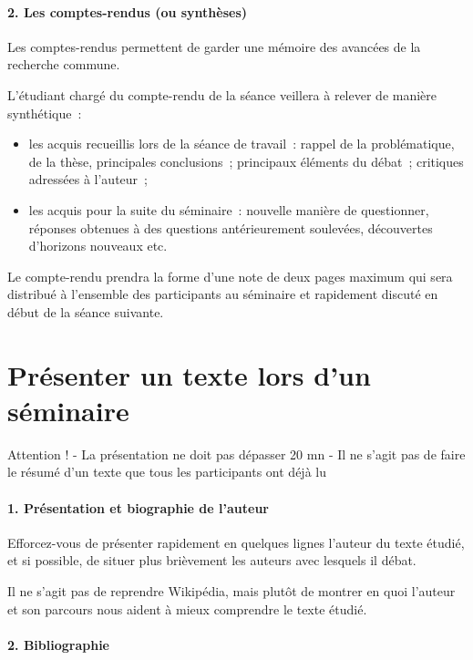 \paragraph{2. Les comptes-rendus (ou synthèses)}

Les comptes-rendus permettent de garder une mémoire des avancées de la
recherche commune.

L'étudiant chargé du compte-rendu de la séance veillera à relever de
manière synthétique~:

\begin{itemize}
\item
  les acquis recueillis lors de la séance de travail~: rappel de la
  problématique, de la thèse, principales conclusions~; principaux
  éléments du débat~; critiques adressées à l'auteur~;
\item
  les acquis pour la suite du séminaire~: nouvelle manière de
  questionner, réponses obtenues à des questions antérieurement
  soulevées, découvertes d'horizons nouveaux etc.
\end{itemize}

Le compte-rendu prendra la forme d'une note de deux pages maximum qui
sera distribué à l'ensemble des participants au séminaire et rapidement
discuté en début de la séance suivante.


\section{Présenter un texte lors d’un séminaire}


\begin{Prop}
Attention !
-	La présentation ne doit pas dépasser 20 mn
-	Il ne s’agit pas de faire le résumé d’un texte que tous les participants ont déjà lu
\end{Prop}


\paragraph{1.	Présentation et biographie de l’auteur 
}
Efforcez-vous de présenter rapidement en quelques lignes l’auteur du texte étudié, et si possible, de situer plus brièvement les auteurs avec lesquels il débat.

Il ne s’agit pas de reprendre Wikipédia, mais plutôt de montrer en quoi l’auteur et son parcours nous aident à mieux comprendre le texte étudié.

\paragraph{2.	Bibliographie}


